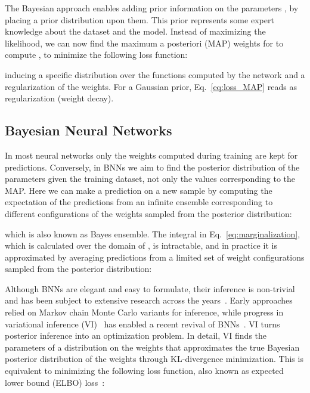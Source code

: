 \documentclass[10pt,twocolumn,letterpaper]{article}
\begin{document}
The Bayesian approach enables adding prior information on the parameters , by placing a prior distribution  upon them. This prior represents some expert knowledge about the dataset and the model. Instead of maximizing the likelihood, we can now find the maximum a posteriori (MAP) weights for 
to compute , \ie to minimize the following loss function:

inducing a specific distribution over the functions computed by the network and a regularization of the weights. For a Gaussian prior, Eq.~\eqref{eq:loss_MAP} reads as  regularization (weight decay).


\subsection{Bayesian Neural Networks}
In 
most neural networks only the  weights computed during training are kept for predictions. Conversely, in BNNs we aim to find the posterior distribution  of the parameters given the training dataset, not only the values corresponding to the MAP. Here we can make {a prediction } on a new sample  by computing the expectation of the predictions from an infinite ensemble corresponding to different configurations of the weights sampled from the posterior distribution:

which is also known as Bayes ensemble. The integral in Eq.~\eqref{eq:marginalization}, {which is calculated over the domain of }, is intractable,  and in practice it is approximated by averaging predictions from a limited set  of  weight configurations sampled from the posterior distribution:



Although BNNs are elegant and easy to formulate, their inference is non-trivial and has been subject to extensive research across the years~\cite{hinton1993keeping,mackay1992practical,neal1995bayesian}. Early approaches relied on Markov chain Monte Carlo variants for inference, while progress in variational inference (VI)~\cite{jordan1999introduction} has enabled a recent revival of BNNs~\cite{graves2011practical, blundell2015weight, hernandez2015probabilistic}. VI turns posterior inference into an optimization problem. In detail, VI finds the parameters  of a distribution  on the weights that approximates the true Bayesian posterior distribution of the weights  through KL-divergence minimization. This is equivalent to minimizing the following loss function, also known as expected lower bound (ELBO) loss~\cite{blundell2015weight, kingma13vae}:
\end{document}
